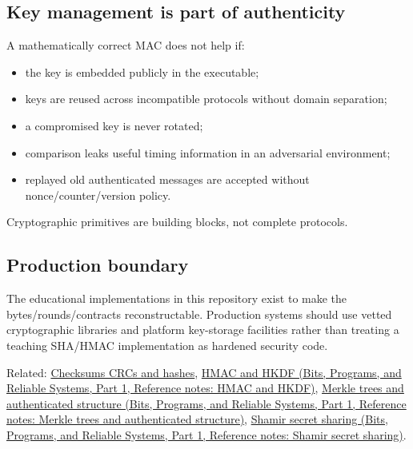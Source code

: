 \subsection{Key management is part of authenticity}\label{appendix-cbe594d1ab0a-key-management-is-part-of-authenticity}

\hypertarget{appendix-cbe594d1ab0a-key-management-is-part-of-authenticity}{}

A mathematically correct MAC does not help if:

\begin{itemize}
\tightlist
\item
  the key is embedded publicly in the executable;
\item
  keys are reused across incompatible protocols without domain separation;
\item
  a compromised key is never rotated;
\item
  comparison leaks useful timing information in an adversarial environment;
\item
  replayed old authenticated messages are accepted without nonce/counter/version policy.
\end{itemize}

Cryptographic primitives are building blocks, not complete protocols.

\subsection{Production boundary}\label{appendix-cbe594d1ab0a-production-boundary}

\hypertarget{appendix-cbe594d1ab0a-production-boundary}{}

The educational implementations in this repository exist to make the bytes/rounds/contracts reconstructable. Production systems should use vetted cryptographic libraries and platform key-storage facilities rather than treating a teaching SHA/HMAC implementation as hardened security code.

Related: \hyperref[appendix-ed338677de0a]{Checksums CRCs and hashes}, \href{../01-Bits-Programs-and-Reliable-Systems-P01/main.pdf\#nameddest=appendix-50af792c9da7}{HMAC and HKDF (Bits, Programs, and Reliable Systems, Part 1, Reference notes: HMAC and HKDF)}, \href{../01-Bits-Programs-and-Reliable-Systems-P01/main.pdf\#nameddest=appendix-098192f8d46d}{Merkle trees and authenticated structure (Bits, Programs, and Reliable Systems, Part 1, Reference notes: Merkle trees and authenticated structure)}, \href{../01-Bits-Programs-and-Reliable-Systems-P01/main.pdf\#nameddest=appendix-5888fd6102dc}{Shamir secret sharing (Bits, Programs, and Reliable Systems, Part 1, Reference notes: Shamir secret sharing)}.
